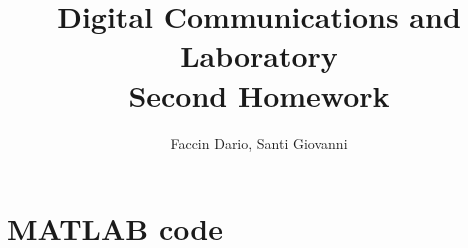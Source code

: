 \documentclass[10pt]{article}
\begin{document}
	\title{Digital Communications and Laboratory \\ Second Homework}
	\author{Faccin Dario, Santi Giovanni}
	\date{}
	\maketitle
	\section*{MATLAB code}
	
	
	
	
	
	
	
	
	
	
	\clearpage
	
	
	
	
	
	
	
	
\end{document}
